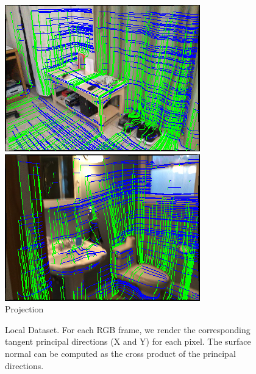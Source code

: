 \begin{figure}
\begin{minipage}{0.19\linewidth}
     \includegraphics[width=\linewidth]{FrameNet/Dataset/pred-000003-vis-gt.png}\\
     \includegraphics[width=\linewidth]{FrameNet/Dataset/pred-000021-vis-gt.png}\\
     \vspace{-0.05in}
     Projection
    \end{minipage}
    \caption{Local \ccff{} Dataset. For each RGB frame, we render the corresponding tangent principal directions (X and Y) for each pixel. The surface normal can be computed as the cross product of the principal directions.}
    \label{fig:framenet-dataset}
\vspace{-0.1in}
\end{figure}

